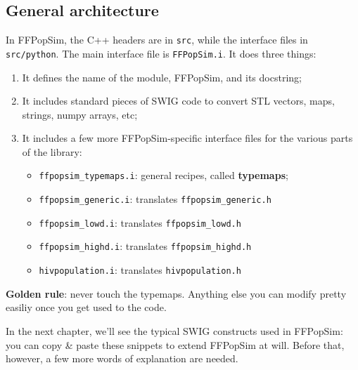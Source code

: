\documentclass[12pt,a4paper,notitlepage,onecolumn]{article}
\begin{document}
\subsection{General architecture}
In FFPopSim, the C++ headers are in \texttt{src}, while the interface files in
\texttt{src/python}. The main interface file is \texttt{FFPopSim.i}. It does
three things:
\begin{enumerate}
\item It defines the name of the module, FFPopSim, and its docstring;
\item It includes standard pieces of SWIG code to convert STL vectors, maps,
strings, numpy arrays, etc;
\item It includes a few more FFPopSim-specific interface files for the various
parts of the library:
\begin{itemize}
\item \texttt{ffpopsim\_typemaps.i}: general recipes, called \textbf{typemaps};
\item \texttt{ffpopsim\_generic.i}: translates \texttt{ffpopsim\_generic.h}
\item \texttt{ffpopsim\_lowd.i}: translates \texttt{ffpopsim\_lowd.h}
\item \texttt{ffpopsim\_highd.i}: translates \texttt{ffpopsim\_highd.h}
\item \texttt{hivpopulation.i}: translates \texttt{hivpopulation.h}
\end{itemize}
\end{enumerate}
\begin{framed}
\noindent\textbf{Golden rule}: never touch the typemaps. Anything else you can modify pretty
easiliy once you get used to the code.
\end{framed}

In the next chapter, we'll see the
typical SWIG constructs used in FFPopSim: you can copy \& paste these snippets
to extend FFPopSim at will. Before that, however, a few more words of
explanation are needed.
\end{document}
